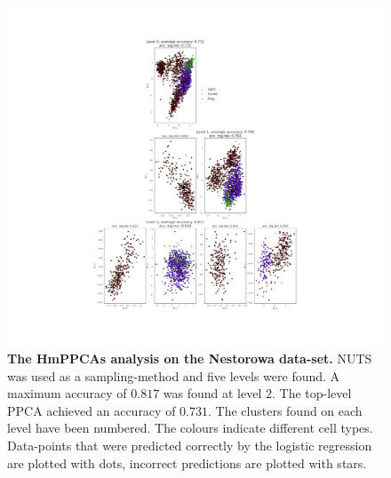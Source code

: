 \begin{figure}
    \centering
    \includegraphics[width=0.95\linewidth]{figs/Nestorowa_tree_NUTS.png}
    \caption[The hmPPCAs analysis on the Nestorowa data-set.]{\small \textbf{The HmPPCAs analysis on the Nestorowa data-set.} \small NUTS was used as a sampling-method and five levels were found. A maximum accuracy of $0.817$ was found at level $2$. The top-level PPCA achieved an accuracy of $0.731$. The clusters found on each level have been numbered. The colours indicate different cell types. Data-points that were predicted correctly by the logistic regression are plotted with dots, incorrect predictions are plotted with stars.}
    \label{fig:nestorowa_nuts}
\end{figure}

